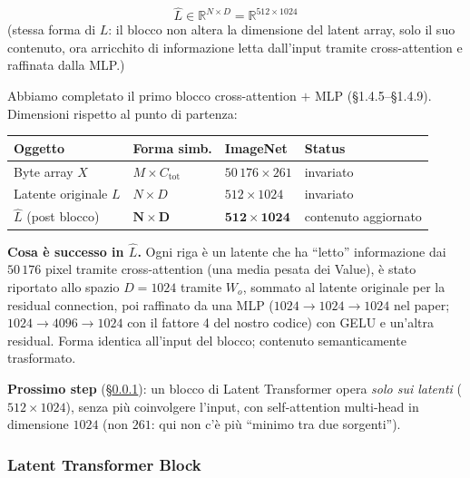 \documentclass[
  11pt,
]{article}
\begin{document}
\begin{formulabox}[title={\textbf{Output del blocco}}]
\[
\hat{L} \in \mathbb{R}^{N \times D} = \mathbb{R}^{512 \times 1024}
\]
\centering\small
(stessa forma di $L$: il blocco non altera la dimensione del latent array, solo il suo contenuto, ora arricchito di informazione letta dall'input tramite cross-attention e raffinata dalla MLP.)
\end{formulabox}

\begin{notabox}[title={\textbf{Checkpoint dimensioni --- fine blocco Cross-Attention}}]
Abbiamo completato il primo blocco cross-attention $+$ MLP (\S1.4.5--\S1.4.9). Dimensioni rispetto al punto di partenza:

\medskip
\begin{center}\small
\setlength{\tabcolsep}{5pt}
\begin{tabular}{@{}llll@{}}
\toprule
\textbf{Oggetto} & \textbf{Forma simb.} & \textbf{ImageNet} & \textbf{Status} \\
\midrule
Byte array $X$ & $M \times C_{\text{tot}}$ & $50\,176 \times 261$ & invariato \\
Latente originale $L$ & $N \times D$ & $512 \times 1024$ & invariato \\
$\widehat{L}$ (post blocco) & $\boldsymbol{N \times D}$ & $\mathbf{512 \times 1024}$ & contenuto aggiornato \\
\bottomrule
\end{tabular}
\end{center}

\medskip
\textbf{Cosa è successo in $\widehat{L}$.} Ogni riga è un latente che ha ``letto'' informazione dai $50\,176$ pixel tramite cross-attention (una media pesata dei Value), è stato riportato allo spazio $D = 1024$ tramite $W_o$, sommato al latente originale per la residual connection, poi raffinato da una MLP ($1024 \to 1024 \to 1024$ nel paper; $1024 \to 4096 \to 1024$ con il fattore 4 del nostro codice) con GELU e un'altra residual. Forma identica all'input del blocco; contenuto semanticamente trasformato.

\medskip
\textbf{Prossimo step} (\S\ref{sec:latent-transformer}): un blocco di Latent Transformer opera \emph{solo sui latenti} ($512 \times 1024$), senza più coinvolgere l'input, con self-attention multi-head in dimensione $1024$ (non $261$: qui non c'è più ``minimo tra due sorgenti'').
\end{notabox}

\clearpage
\subsubsection{Latent Transformer Block}
\label{sec:latent-transformer}
\end{document}
